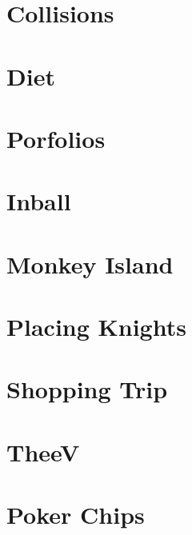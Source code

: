 \documentclass[a4paper, 10pt]{article}
\let\stdsection\section
\renewcommand\section{\newpage\stdsection}
\newcommand{\includecode}[1]{
    }
\begin{document}
    \section{Collisions}
        \includecode{../problems/w08/Collisions/Collisions1.cpp}
        
    \section{Diet}
        \includecode{../problems/w08/Diet/Diet1.cpp}
        
    \section{Porfolios}
        \includecode{../problems/w08/Portfolios/Portfolios1.cpp}
    
    \section{Inball}
        \includecode{../problems/w08/Inball/Inball1.cpp}
    
    
    \section{Monkey Island}
        \includecode{../problems/w09/Monkey_Island/MonkeyIsland1.cpp}
        
    \section{Placing Knights}
        \includecode{../problems/w09/Placing_Knights/PlacingKnights1.cpp}
        
    \section{Shopping Trip}
        \includecode{../problems/w09/Shopping_Trip/ShoppingTrip1.cpp}
        
    \section{TheeV}
        \includecode{../problems/w09/TheeV/TheeV1.cpp}
   
    
    \section{Poker Chips}
        \includecode{../problems/w10/Poker_Chips/PokerChips1.cpp}
        
\end{document}
